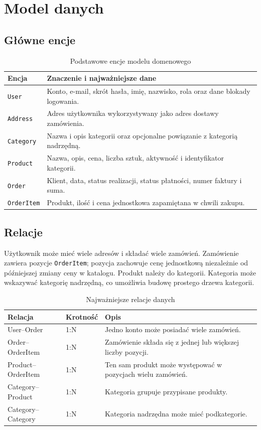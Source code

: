 \documentclass[12pt,a4paper]{article}
\begin{document}
\section{Model danych}

\subsection{Główne encje}
\begin{table}[H]
\centering
\small
\begin{tabularx}{\textwidth}{@{}l X@{}}
\toprule
\textbf{Encja} & \textbf{Znaczenie i najważniejsze dane}\\
\midrule
\texttt{User} & Konto, e-mail, skrót hasła, imię, nazwisko, rola oraz dane blokady logowania.\\
\texttt{Address} & Adres użytkownika wykorzystywany jako adres dostawy zamówienia.\\
\texttt{Category} & Nazwa i opis kategorii oraz opcjonalne powiązanie z kategorią nadrzędną.\\
\texttt{Product} & Nazwa, opis, cena, liczba sztuk, aktywność i identyfikator kategorii.\\
\texttt{Order} & Klient, data, status realizacji, status płatności, numer faktury i suma.\\
\texttt{OrderItem} & Produkt, ilość i cena jednostkowa zapamiętana w chwili zakupu.\\
\bottomrule
\end{tabularx}
\caption{Podstawowe encje modelu domenowego}
\end{table}

\subsection{Relacje}
Użytkownik może mieć wiele adresów i składać wiele zamówień. Zamówienie zawiera
pozycje \texttt{OrderItem}; pozycja zachowuje cenę jednostkową niezależnie od
późniejszej zmiany ceny w katalogu. Produkt należy do kategorii. Kategoria może
wskazywać kategorię nadrzędną, co umożliwia budowę prostego drzewa kategorii.

\begin{table}[H]
\centering
\small
\begin{tabularx}{\textwidth}{@{}l l X@{}}
\toprule
\textbf{Relacja} & \textbf{Krotność} & \textbf{Opis}\\
\midrule
User--Order & 1:N & Jedno konto może posiadać wiele zamówień.\\
Order--OrderItem & 1:N & Zamówienie składa się z jednej lub większej liczby pozycji.\\
Product--OrderItem & 1:N & Ten sam produkt może występować w pozycjach wielu zamówień.\\
Category--Product & 1:N & Kategoria grupuje przypisane produkty.\\
Category--Category & 1:N & Kategoria nadrzędna może mieć podkategorie.\\
\bottomrule
\end{tabularx}
\caption{Najważniejsze relacje danych}
\end{table}
\end{document}
